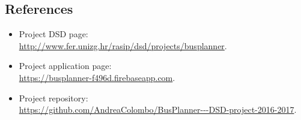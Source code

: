\subsection{References}
\begin{itemize}
	\item Project DSD page:\\ \url{http://www.fer.unizg.hr/rasip/dsd/projects/busplanner}.
	\item Project application page:\\ \url{https://busplanner-f496d.firebaseapp.com}.
	\item Project repository:\\ \url{https://github.com/AndreaColombo/BusPlanner---DSD-project-2016-2017}.
\end{itemize}